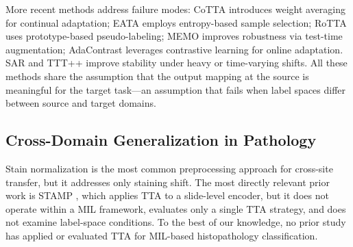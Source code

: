 \documentclass[conference]{IEEEtran}
\begin{document}
More recent methods address failure modes: CoTTA \cite{wang2022cotta} introduces weight averaging for continual adaptation; EATA \cite{niu2022eata} employs entropy-based sample selection; RoTTA \cite{yuan2023rotta} uses prototype-based pseudo-labeling; MEMO \cite{zhang2022tip} improves robustness via test-time augmentation; AdaContrast \cite{chen2022adacontrast} leverages contrastive learning for online adaptation. SAR \cite{niu2023towards} and TTT++ \cite{liu2021ttt} improve stability under heavy or time-varying shifts. All these methods share the assumption that the output mapping at the source is meaningful for the target task---an assumption that fails when label spaces differ between source and target domains.

\subsection{Cross-Domain Generalization in Pathology}

Stain normalization \cite{macenko2009method} is the most common preprocessing approach for cross-site transfer, but it addresses only staining shift. The most directly relevant prior work is STAMP \cite{chen2023stamp}, which applies TTA to a slide-level encoder, but it does not operate within a MIL framework, evaluates only a single TTA strategy, and does not examine label-space conditions. To the best of our knowledge, no prior study has applied or evaluated TTA for MIL-based histopathology classification.
\end{document}
